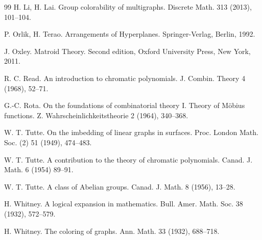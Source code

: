 \documentclass[12pt]{article}%
\numberwithin{equation}{section}
\begin{document}
\begin{thebibliography}{99}
H. Li, H. Lai. Group colorability of multigraphs. Discrete Math. 313 (2013), 101--104.

P. Orlik, H. Terao. Arrangements of Hyperplanes. Springer-Verlag, Berlin, 1992.

J. Oxley. Matroid Theory. Second edition, Oxford University Press, New York, 2011.

R. C. Read. An introduction to chromatic polynomials. J. Combin. Theory 4 (1968), 52--71.

G.-C. Rota. On the foundations of combinatorial theory I. Theory of M\"obius functions. Z. Wahrscheinlichkeitstheorie 2 (1964), 340--368.

W. T. Tutte. On the imbedding of linear graphs in surfaces. Proc. London Math. Soc. (2) 51 (1949), 474--483.

W. T. Tutte. A contribution to the theory of chromatic polynomials. Canad. J. Math. 6 (1954) 89--91.

W. T. Tutte. A class of Abelian groups. Canad. J. Math. 8 (1956), 13--28. 

H. Whitney. A logical expansion in mathematics. Bull. Amer. Math. Soc. 38 (1932), 572--579.

H. Whitney. The coloring of graphs. Ann. Math. 33 (1932), 688--718.
\end{thebibliography}
\end{document}
